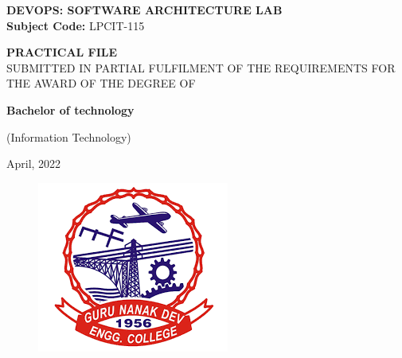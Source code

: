 \documentclass[12pt]{article}
\begin{document}
\begin{titlepage}
 \centering
 
 
\begin{center}
{\large \bfseries \uppercase{DevOps: Software Architecture Lab}}\\

\vspace{1\baselineskip}
\textbf{Subject Code:} LPCIT-115

\vspace{3\baselineskip}
 
{\large \uppercase{\textbf{Practical File}\\
 \vspace{2\baselineskip}
SUBMITTED IN PARTIAL FULFILMENT OF THE REQUIREMENTS FOR\\
 \vspace{1\baselineskip}
THE AWARD OF THE DEGREE OF\\

\vspace{2\baselineskip}
}


{\bfseries Bachelor of technology\\}
\vspace{1\baselineskip}
} 
(Information Technology)
\vspace{2\baselineskip}
\end{center}
April, 2022\\
\vspace{1\baselineskip}

\begin{figure}[h]
\centering
\includegraphics[scale=0.7]{gndeclogo}
\vspace{0.6\baselineskip}
\end{figure}

\vspace{1\baselineskip}



\end{titlepage}
\end{document}
